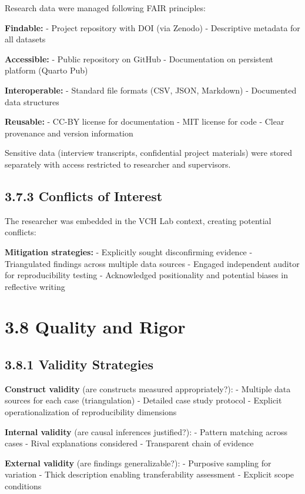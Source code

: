 \documentclass[
  oneside,
  open=any]{scrbook}
\begin{document}
Research data were managed following FAIR principles:

\textbf{Findable:} - Project repository with DOI (via Zenodo) -
Descriptive metadata for all datasets

\textbf{Accessible:} - Public repository on GitHub - Documentation on
persistent platform (Quarto Pub)

\textbf{Interoperable:} - Standard file formats (CSV, JSON, Markdown) -
Documented data structures

\textbf{Reusable:} - CC-BY license for documentation - MIT license for
code - Clear provenance and version information

Sensitive data (interview transcripts, confidential project materials)
were stored separately with access restricted to researcher and
supervisors.

\subsection{3.7.3 Conflicts of Interest}\label{conflicts-of-interest}

The researcher was embedded in the VCH Lab context, creating potential
conflicts:

\textbf{Mitigation strategies:} - Explicitly sought disconfirming
evidence - Triangulated findings across multiple data sources - Engaged
independent auditor for reproducibility testing - Acknowledged
positionality and potential biases in reflective writing

\section{3.8 Quality and Rigor}\label{quality-and-rigor}

\subsection{3.8.1 Validity Strategies}\label{validity-strategies}

\textbf{Construct validity} (are constructs measured appropriately?): -
Multiple data sources for each case (triangulation) - Detailed case
study protocol - Explicit operationalization of reproducibility
dimensions

\textbf{Internal validity} (are causal inferences justified?): - Pattern
matching across cases - Rival explanations considered - Transparent
chain of evidence

\textbf{External validity} (are findings generalizable?): - Purposive
sampling for variation - Thick description enabling transferability
assessment - Explicit scope conditions
\end{document}
